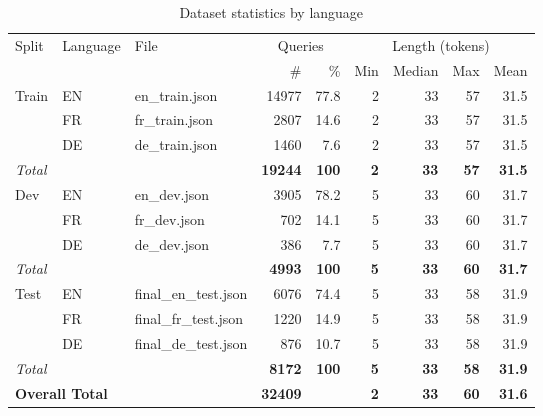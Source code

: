 \begin{table}[htbp]
	\centering
	\caption{Dataset statistics by language}
	\label{tab:query_stats}
	\begin{tabular}{l l l r r r r r r}
		\toprule
		\multirow{2}{*}{Split} & \multirow{2}{*}{Language} & \multirow{2}{*}{File}
		& \multicolumn{2}{c}{Queries}
		& \multicolumn{4}{c}{Length (tokens)} \\
		\cmidrule(lr){4-5} \cmidrule(lr){6-9}
		& & & \# & \% & Min & Median & Max & Mean \\
		\midrule

		\multirow{3}{*}{Train}
		& EN & en\_train.json & 14977 & 77.8 & 2 & 33 & 57 & 31.5 \\
		& FR & fr\_train.json & 2807  & 14.6 & 2 & 33 & 57 & 31.5 \\
		& DE & de\_train.json & 1460  & 7.6  & 2 & 33 & 57 & 31.5 \\
		\textit{Total} & & & \textbf{19244} & \textbf{100} & \textbf{2} & \textbf{33} & \textbf{57} & \textbf{31.5} \\

		\midrule

		\multirow{3}{*}{Dev}
		& EN & en\_dev.json & 3905 & 78.2 & 5 & 33 & 60 & 31.7 \\
		& FR & fr\_dev.json & 702  & 14.1 & 5 & 33 & 60 & 31.7 \\
		& DE & de\_dev.json & 386  & 7.7  & 5 & 33 & 60 & 31.7 \\
		\textit{Total} & & & \textbf{4993} & \textbf{100} & \textbf{5} & \textbf{33} & \textbf{60} & \textbf{31.7} \\

		\midrule

		\multirow{3}{*}{Test}
		& EN & final\_en\_test.json & 6076 & 74.4 & 5 & 33 & 58 & 31.9 \\
		& FR & final\_fr\_test.json & 1220 & 14.9 & 5 & 33 & 58 & 31.9 \\
		& DE & final\_de\_test.json & 876  & 10.7 & 5 & 33 & 58 & 31.9 \\
		\textit{Total} & & & \textbf{8172} & \textbf{100} & \textbf{5} & \textbf{33} & \textbf{58} & \textbf{31.9} \\

		\midrule

		\multicolumn{3}{l}{\textbf{Overall Total}}
		& \textbf{32409} & & \textbf{2} & \textbf{33} & \textbf{60} & \textbf{31.6} \\

		\bottomrule
	\end{tabular}

	\vspace{2mm}
\end{table}

